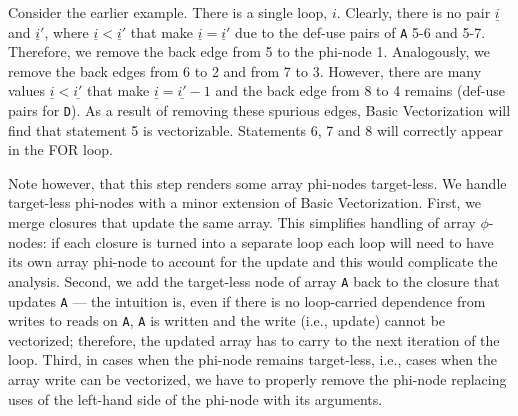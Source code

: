 \documentclass[sigconf, screen, natbib=false, dvipsnames, table]{acmart}
\theoremstyle{definition}
\begin{document}
Consider the earlier example. There is a single loop, $i$. Clearly, there is no pair $\underline{i}$ and $\underline{i}'$, where $\underline{i} < \underline{i}'$ that make $\underline{i} = \underline{i}'$ 
due to the def-use pairs of \texttt{A} 5-6 and 5-7.
Therefore, we remove the back edge from 5 to the phi-node 1. Analogously, we remove the back edges from 6 to 2 and from 7 to 3. However, there are many values $\underline{i} < \underline{i'}$ that make $\underline{i} = \underline{i'}-1$ and the back edge from 8 to 4 remains (def-use pairs for \texttt{D}). As a result of removing these spurious edges, Basic Vectorization will find that statement 5 is vectorizable. Statements 6, 7 and 8 will correctly appear in the FOR loop.

Note however, that this step renders some array phi-nodes target-less. We handle target-less phi-nodes with a minor extension of Basic Vectorization. 
First, we merge closures that update the same array. This simplifies handling of array $\phi$-nodes: if each closure is turned into a separate loop
each loop will need to have its own array phi-node to account for the update and this would complicate the analysis.
Second, we add the target-less node of array \texttt{A} back to the closure that updates \texttt{A} ---
the intuition is, even if there is no loop-carried dependence from writes to reads on \texttt{A}, \texttt{A} is written and the write (i.e., update) cannot be vectorized; 
therefore, the updated array has to carry to the next iteration of the loop. Third, in cases when the phi-node remains target-less, i.e., cases when the
array write can be vectorized, we have to properly remove the phi-node replacing uses of the left-hand side of the phi-node with its arguments.

\end{document}
